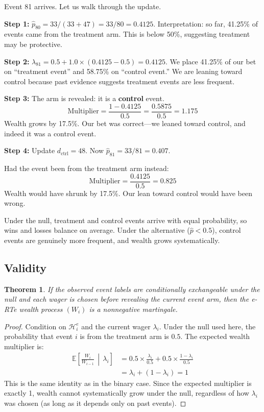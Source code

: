 \documentclass[10pt]{article}
\newtheorem{theorem}{Theorem}
\begin{document}
Event 81 arrives. Let us walk through the update.

\textbf{Step 1:} $\hat{p}_{80} = 33 / (33 + 47) = 33/80 = 0.4125$. Interpretation: so far, 41.25\% of events came from the treatment arm. This is below 50\%, suggesting treatment may be protective.

\textbf{Step 2:} $\lambda_{81} = 0.5 + 1.0 \times (0.4125 - 0.5) = 0.4125$. We place 41.25\% of our bet on ``treatment event'' and 58.75\% on ``control event.'' We are leaning toward control because past evidence suggests treatment events are less frequent.

\textbf{Step 3:} The arm is revealed: it is a \textbf{control} event.
\begin{equation}
\text{Multiplier} = \frac{1 - 0.4125}{0.5} = \frac{0.5875}{0.5} = 1.175
\end{equation}
Wealth grows by 17.5\%. Our bet was correct---we leaned toward control, and indeed it was a control event.

\textbf{Step 4:} Update $d_{\text{ctrl}} = 48$. Now $\hat{p}_{81} = 33/81 = 0.407$.

Had the event been from the treatment arm instead:
\begin{equation}
\text{Multiplier} = \frac{0.4125}{0.5} = 0.825
\end{equation}
Wealth would have shrunk by 17.5\%. Our lean toward control would have been wrong.

Under the null, treatment and control events arrive with equal probability, so wins and losses balance on average. Under the alternative ($\hat{p} < 0.5$), control events are genuinely more frequent, and wealth grows systematically.

\subsection{Validity}

\begin{theorem}
If the observed event labels are conditionally exchangeable under the null and each wager is chosen before revealing the current event arm, then the e-RTe wealth process $(W_i)$ is a nonnegative martingale.
\end{theorem}

\begin{proof}
Condition on $\mathcal{H}^e_i$ and the current wager $\lambda_i$. Under the null used here, the probability that event $i$ is from the treatment arm is $0.5$. The expected wealth multiplier is:
\begin{align}
\mathbb{E}\left[\frac{W_i}{W_{i-1}} \,\middle|\, \lambda_i\right] &= 0.5 \times \frac{\lambda_i}{0.5} + 0.5 \times \frac{1 - \lambda_i}{0.5} \\
&= \lambda_i + (1 - \lambda_i) = 1
\end{align}
This is the same identity as in the binary case. Since the expected multiplier is exactly 1, wealth cannot systematically grow under the null, regardless of how $\lambda_i$ was chosen (as long as it depends only on past events).
\end{proof}
\end{document}
